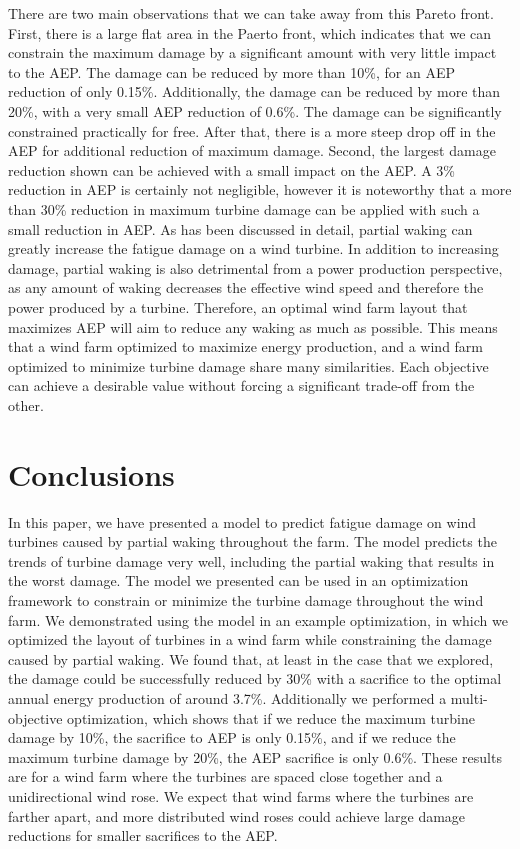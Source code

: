 \documentclass[11pt,letterpaper]{article}
\begin{document}
There are two main observations that we can take away from this Pareto front. First, there is a large flat area in the Paerto front, which indicates that we can constrain the maximum damage by a significant amount with very little impact to the AEP. The damage can be reduced by more than 10\%, for an AEP reduction of only 0.15\%. Additionally, the damage can be reduced by more than 20\%, with a very small AEP reduction of 0.6\%. The damage can be significantly constrained practically for free. After that, there is a more steep drop off in the AEP for additional reduction of maximum damage.
% 
Second, the largest damage reduction shown can be achieved with a small impact on the AEP. A 3\% reduction in AEP is certainly not negligible, however it is noteworthy that a more than 30\% reduction in maximum turbine damage can be applied with such a small reduction in AEP. As has been discussed in detail, partial waking can greatly increase the fatigue damage on a wind turbine. In addition to increasing damage, partial waking is also detrimental from a power production perspective, as any amount of waking decreases the effective wind speed and therefore the power produced by a turbine. Therefore, an optimal wind farm layout that maximizes AEP will aim to reduce any waking as much as possible. This means that a wind farm optimized to maximize energy production, and a wind farm optimized to minimize turbine damage share many similarities. Each objective can achieve a desirable value without forcing a significant trade-off from the other.


\section{Conclusions}
In this paper, we have presented a model to predict fatigue damage on wind turbines caused by partial waking throughout the farm. The model predicts the trends of turbine damage very well, including the partial waking that results in the worst damage. The model we presented can be used in an optimization framework to constrain or minimize the turbine damage throughout the wind farm. We demonstrated using the model in an example optimization, in which we optimized the layout of turbines in a wind farm while constraining the damage caused by partial waking. We found that, at least in the case that we explored, the damage could be successfully reduced by 30\% with a sacrifice to the optimal annual energy production of around 3.7\%. Additionally we performed a multi-objective optimization, which shows that if we reduce the maximum turbine damage by 10\%, the sacrifice to AEP is only 0.15\%, and if we reduce the maximum turbine damage by 20\%, the AEP sacrifice is only 0.6\%. These results are for a wind farm where the turbines are spaced close together and a unidirectional wind rose. We expect that wind farms where the turbines are farther apart, and more distributed wind roses could achieve large damage reductions for smaller sacrifices to the AEP.
\end{document}
